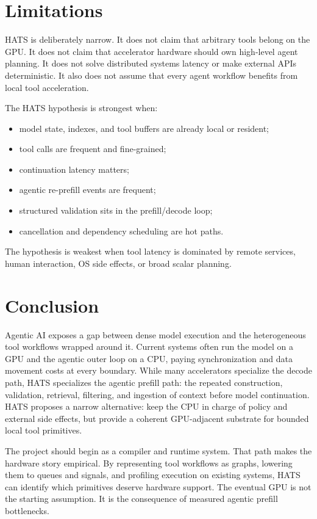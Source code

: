 \documentclass[11pt]{article}
\begin{document}
\section{Limitations}

HATS is deliberately narrow. It does not claim that arbitrary tools belong on
the GPU. It does not claim that accelerator hardware should own high-level
agent planning. It does not solve distributed systems latency or make external
APIs deterministic. It also does not assume that every agent workflow benefits
from local tool acceleration.

The HATS hypothesis is strongest when:

\begin{itemize}[leftmargin=*]
  \item model state, indexes, and tool buffers are already local or resident;
  \item tool calls are frequent and fine-grained;
  \item continuation latency matters;
  \item agentic re-prefill events are frequent;
  \item structured validation sits in the prefill/decode loop;
  \item cancellation and dependency scheduling are hot paths.
\end{itemize}

The hypothesis is weakest when tool latency is dominated by remote services,
human interaction, OS side effects, or broad scalar planning.

\section{Conclusion}

Agentic AI exposes a gap between dense model execution and the heterogeneous
tool workflows wrapped around it. Current systems often run the model on a GPU
and the agentic outer loop on a CPU, paying synchronization and data movement
costs at every boundary. While many accelerators specialize the decode path,
HATS specializes the agentic prefill path: the repeated construction,
validation, retrieval, filtering, and ingestion of context before model
continuation. HATS proposes a narrow alternative: keep the CPU in charge of
policy and external side effects, but provide a coherent GPU-adjacent substrate
for bounded local tool primitives.

The project should begin as a compiler and runtime system. That path makes the
hardware story empirical. By representing tool workflows as graphs, lowering
them to queues and signals, and profiling execution on existing systems, HATS
can identify which primitives deserve hardware support. The eventual GPU is not
the starting assumption. It is the consequence of measured agentic prefill
bottlenecks.
\end{document}
